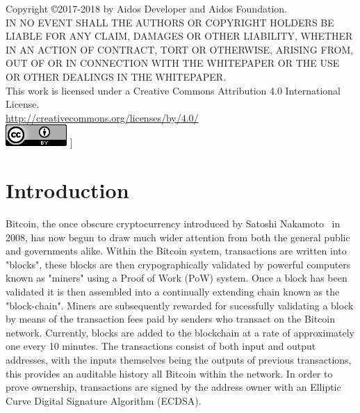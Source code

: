 \documentclass[a4paper,10pt,twocolumn]{article}
\begin{document}
Copyright \copyright 2017-2018 by Aidos Developer and Aidos Foundation. \\

IN NO EVENT SHALL THE AUTHORS OR COPYRIGHT HOLDERS BE LIABLE FOR ANY CLAIM, DAMAGES OR OTHER
LIABILITY, WHETHER IN AN ACTION OF CONTRACT, TORT OR OTHERWISE, ARISING FROM,
OUT OF OR IN CONNECTION WITH THE WHITEPAPER OR THE USE OR OTHER DEALINGS IN
THE WHITEPAPER. \\

This work is licensed under a Creative Commons Attribution 4.0 International License. \\
\url{http://creativecommons.org/licenses/by/4.0/} \\
\includegraphics{cc}
]

\twocolumn[
\tableofcontents
]

\clearpage

\section{Introduction}
Bitcoin, the once obscure cryptocurrency introduced by Satoshi Nakamoto~\cite{btc} in 2008, has now begun to draw much wider attention 
from both the general public and governments alike. Within the Bitcoin system, transactions are written into "blocks", these blocks are 
then crypographically validated by powerful computers known as "miners" using a Proof of Work (PoW) system. Once a block has been 
validated it is then assembled into a continually extending chain known as the "block-chain". Miners are subsequently rewarded for 
sucessfully validating a block by means of the transaction fees paid by senders who transact on the Bitcoin network. Currently, blocks 
are added to the blockchain at a rate of approximately one every 10 minutes. The transactions consist of both input and output 
addresses, with the inputs themselves being the outputs of previous transactions, this provides an auditable history all Bitcoin within 
the network. In order to prove ownership, transactions are signed by the address owner with an Elliptic Curve Digital Signature 
Algorithm (ECDSA).
\end{document}
